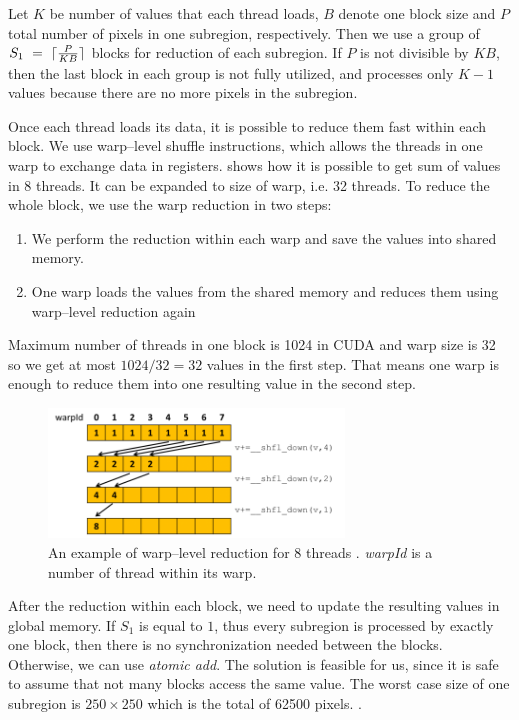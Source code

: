 Let $K$ be number of values that each thread loads, $B$ denote one block size and $P$ total number of pixels in one subregion, respectively. Then we use a group of $S_1~=~\lceil\frac{P}{KB}\rceil$ blocks for reduction of each subregion. If $P$ is not divisible by $KB$, then the last block in each group is not fully utilized, and processes only $K - 1$ values because there are no more pixels in the subregion.



Once each thread loads its data, it is possible to reduce them fast within each block. We use warp--level shuffle instructions, which allows the threads in one warp to exchange data in registers.  shows how it is possible to get sum of values in 8 threads. It can be expanded to size of warp, i.e. 32 threads. To reduce the whole block, we use the warp reduction in two steps:
\begin{enumerate}
	\item We perform the reduction within each warp and save the values into shared memory.
	\item One warp loads the values from the shared memory and reduces them using warp--level reduction again
\end{enumerate}
Maximum number of threads in one block is 1024 in CUDA and warp size is 32 so we get at most $1024/32 = 32$ values in the first step. That means one warp is enough to reduce them into one resulting value in the second step.

\begin{figure}
	\centering
	\includegraphics[width=0.7\textwidth]{img/warp_reduce}
	\caption{An example of warp--level reduction for 8 threads \cite{parallelReduction}. \emph{warpId} is a number of thread within its warp.}
	\label{warp_reduce}
\end{figure}

After the reduction within each block, we need to update the resulting values in global memory. If $S_1$ is equal to $1$, thus every subregion is processed by exactly one block, then there is no synchronization needed between the blocks. Otherwise, we can use \emph{atomic add}. The solution is feasible for us, since it is safe to assume that not many blocks access the same value. The worst case size of one subregion is $250 \times 250$ which is the total of 62500 pixels. . 

